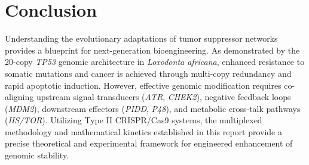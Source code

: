 \documentclass[11pt,a4paper]{article}
\begin{document}
\section{Conclusion}

Understanding the evolutionary adaptations of tumor suppressor networks provides a blueprint for next-generation bioengineering. As demonstrated by the 20-copy \textit{TP53} genomic architecture in \textit{Loxodonta africana}, enhanced resistance to somatic mutations and cancer is achieved through multi-copy redundancy and rapid apoptotic induction. However, effective genomic modification requires co-aligning upstream signal transducers (\textit{ATR}, \textit{CHEK2}), negative feedback loops (\textit{MDM2}), downstream effectors (\textit{PIDD}, \textit{P48}), and metabolic cross-talk pathways (\textit{IIS/TOR}). Utilizing Type II CRISPR/Cas9 systems, the multiplexed methodology and mathematical kinetics established in this report provide a precise theoretical and experimental framework for engineered enhancement of genomic stability.
\end{document}
